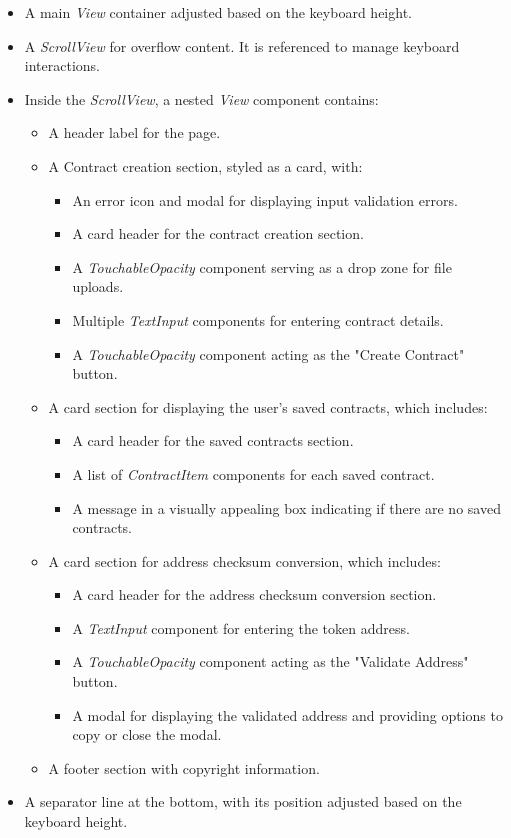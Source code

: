 \begin{itemize}
    \item A main \textit{View} container adjusted based on the keyboard height.
    \item A \textit{ScrollView} for overflow content. It is referenced to manage keyboard interactions.
    \item Inside the \textit{ScrollView}, a nested \textit{View} component contains:
    \begin{itemize}
        \item A header label for the page.
        \item A Contract creation section, styled as a card, with:
        \begin{itemize}
            \item An error icon and modal for displaying input validation errors.
            \item A card header for the contract creation section.
            \item A \textit{TouchableOpacity} component serving as a drop zone for file uploads.
            \item Multiple \textit{TextInput} components for entering contract details.
            \item A \textit{TouchableOpacity} component acting as the "Create Contract" button.
        \end{itemize}
        \item A card section for displaying the user's saved contracts, which includes:
        \begin{itemize}
            \item A card header for the saved contracts section.
            \item A list of \textit{ContractItem} components for each saved contract.
            \item A message in a visually appealing box indicating if there are no saved contracts.
        \end{itemize}
        \item A card section for address checksum conversion, which includes:
        \begin{itemize}
            \item A card header for the address checksum conversion section.
            \item A \textit{TextInput} component for entering the token address.
            \item A \textit{TouchableOpacity} component acting as the "Validate Address" button.
            \item A modal for displaying the validated address and providing options to copy or close the modal.
        \end{itemize}
        \item A footer section with copyright information.
    \end{itemize}
    \item A separator line at the bottom, with its position adjusted based on the keyboard height.
\end{itemize}

